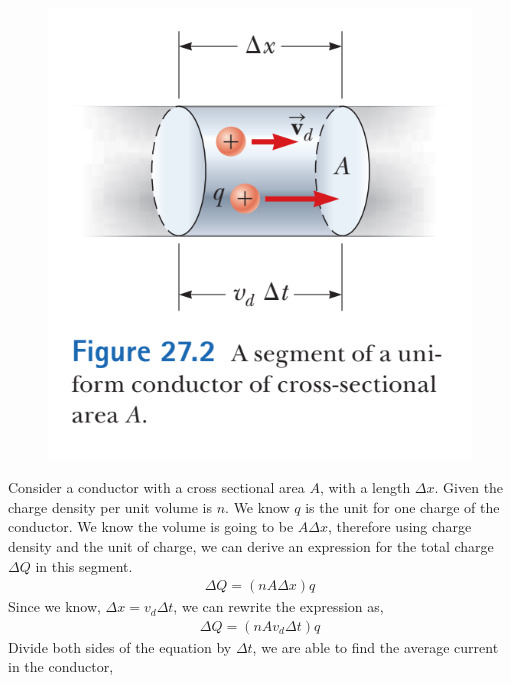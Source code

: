 \documentclass[12pt, titlepage, oneside]{article}
\begin{document}
\vspace{0.5cm}
\begin{figure}
	\begin{center}\vspace{-1.1cm}
		\includegraphics[scale=0.7]{1.png}
	\end{center}
\end{figure}
Consider a conductor with a cross sectional area $A$, with a length $\Delta x$. Given the charge density per unit volume is $n$. We know $q$ is the unit for one charge of the conductor. We know the volume is going to be $A \Delta x$, therefore using charge density and the unit of charge, we can derive an expression for the total charge $\Delta Q$ in this segment.
\begin{align*}
\Delta Q = (nA\Delta x)q
\end{align*}
Since we know, $\Delta x = v_d \Delta t$, we can rewrite the expression as,
\begin{align*}
\Delta Q = (nAv_d\Delta t)q
\end{align*}
Divide both sides of the equation by $\Delta t$, we are able to find the average current in the conductor,\\

\noindent{}\\
\end{document}
